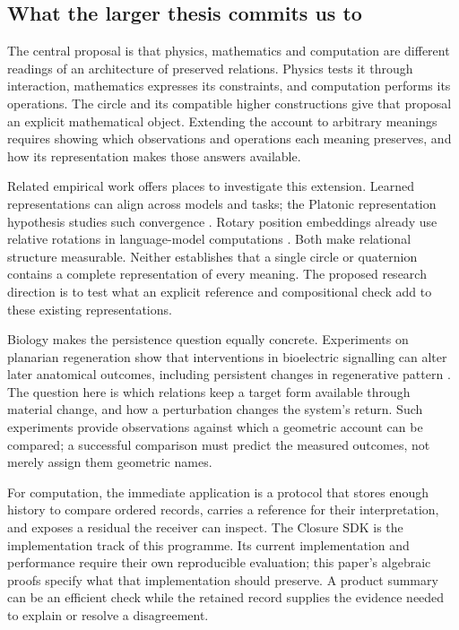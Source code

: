 \documentclass[11pt,a4paper]{article}
\begin{document}
\subsection{What the larger thesis commits us to}
The central proposal is that physics, mathematics and computation are
different readings of an architecture of preserved relations. Physics tests
it through interaction, mathematics expresses its constraints, and computation
performs its operations. The circle and its compatible higher constructions
give that proposal an explicit mathematical object. Extending the account to
arbitrary meanings requires showing which observations and operations each
meaning preserves, and how its representation makes those answers available.

Related empirical work offers places to investigate this extension. Learned
representations can align across models and tasks; the Platonic representation
hypothesis studies such convergence \citep{Huh2024}. Rotary position embeddings
already use relative rotations in language-model computations \citep{Su2021}.
Both make relational structure measurable. Neither establishes that a single
circle or quaternion contains a complete representation of every meaning.
The proposed research direction is to test what an explicit reference and
compositional check add to these existing representations.

Biology makes the persistence question equally concrete. Experiments on
planarian regeneration show that interventions in bioelectric signalling can
alter later anatomical outcomes, including persistent changes in regenerative
pattern \citep{Durant2017}. The question here is which relations keep a target
form available through material change, and how a perturbation changes the
system's return. Such experiments provide observations against which a
geometric account can be compared; a successful comparison must predict the
measured outcomes, not merely assign them geometric names.

For computation, the immediate application is a protocol that stores enough
history to compare ordered records, carries a reference for their interpretation,
and exposes a residual the receiver can inspect. The Closure SDK is the
implementation track of this programme. Its current implementation and
performance require their own reproducible evaluation; this paper's algebraic
proofs specify what that implementation should preserve. A product summary can
be an efficient check while the retained record supplies the evidence needed
to explain or resolve a disagreement.
\end{document}
